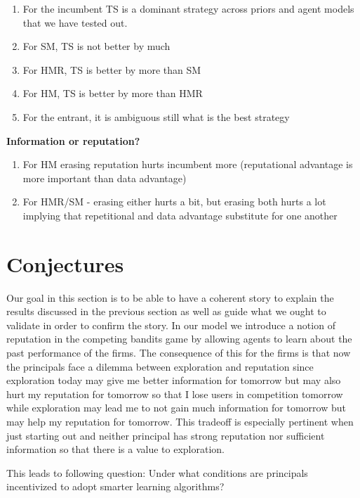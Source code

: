 \documentclass[11pt,letterpaper]{article}
\begin{document}
\begin{enumerate}
\item For the incumbent TS is a dominant strategy across priors and agent models that we have tested out.
\item For SM, TS is not better by much
\item For HMR, TS is better by more than SM
\item For HM, TS is better by more than HMR
\item For the entrant, it is ambiguous still what is the best strategy
\end{enumerate}

\textbf{Information or reputation?}

\begin{enumerate}
\item For HM erasing reputation hurts incumbent more (reputational advantage is more important than data advantage)
\item For HMR/SM - erasing either hurts a bit, but erasing both hurts a lot implying that repetitional and data advantage substitute for one another
\end{enumerate}

\pagebreak

\section*{Conjectures}

Our goal in this section is to be able to have a coherent story to explain the results discussed in the previous section as well as guide what we ought to validate in order to confirm the story. In our model we introduce a notion of reputation in the competing bandits game by allowing agents to learn about the past performance of the firms. The consequence of this for the firms is that now the principals face a dilemma between exploration and reputation since exploration today may give me better information for tomorrow but may also hurt my reputation for tomorrow so that I lose users in competition tomorrow while exploration may lead me to not gain much information for tomorrow but may help my reputation for tomorrow. This tradeoff is especially pertinent when just starting out and neither principal has strong reputation nor sufficient information so that there is a value to exploration.

This leads to following question: Under what conditions are principals incentivized to adopt smarter learning algorithms?
\end{document}
